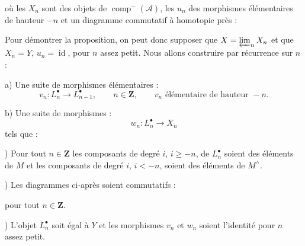 \clearpage
{}%
\begingroup\small\setlength{\parskip}{0pt}\setlength{\emergencystretch}{1.5em}
\setlength{\abovedisplayskip}{4pt plus 2pt minus 2pt}%
\setlength{\belowdisplayskip}{4pt plus 2pt minus 2pt}%

où les $X_n$ sont des objets de $\operatorname{comp}^{-}(\mathcal A)$,
les $u_n$ des morphismes élémentaires de hauteur $-n$ et un diagramme
commutatif à homotopie près :

\begin{center}
\end{center}

Pour démontrer la proposition, on peut donc supposer que
$X=\varprojlim_n X_n$ et que $X_n=Y$, $u_n=\operatorname{id}$, pour $n$
assez petit. Nous allons construire par récurrence sur $n$ :

\noindent a) Une suite de morphismes élémentaires :
\[
v_n\colon L_n^\bullet\longrightarrow L_{n-1}^\bullet,
\qquad n\in\mathbf Z,\qquad
v_n\text{ élémentaire de hauteur }-n.
\]

\noindent b) Une suite de morphismes :
\[
w_n\colon L_n^\bullet\longrightarrow X_n
\]
tels que :

) Pour tout $n\in\mathbf Z$ les composants de degré $i$,
$i\geq -n$, de $L_n^\bullet$ soient des éléments de $M$ et les composants de
degré $i$, $i<-n$, soient des éléments de $M^\wedge$.

) Les diagrammes ci-après soient commutatifs :
\begin{center}
\end{center}
pour tout $n\in\mathbf Z$.

) L'objet $L_n^\bullet$ soit égal à $Y$ et les morphismes $v_n$
et $w_n$ soient l'identité pour $n$ assez petit.
\endgroup
